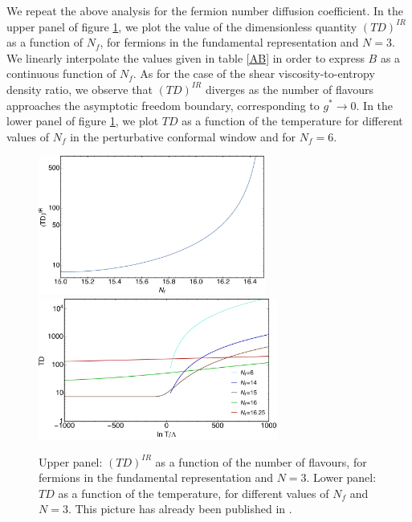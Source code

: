   
We repeat the above analysis for the fermion number diffusion coefficient. In the upper panel of figure \ref{D_Nf}, we plot the value of the dimensionless quantity $(T D)^{IR}$ as a function of $N_f$, for fermions in the fundamental representation and $N=3$. We linearly interpolate the values given in table \ref{AB} in order to express $B$ as a continuous function of $N_f$.
As for the case of the shear viscosity-to-entropy density ratio, we observe that $(TD)^{IR}$ diverges as the number of flavours approaches the asymptotic freedom boundary, corresponding to $g^* \to 0$. In the lower panel of figure \ref{D_Nf}, we plot $T D$ as a function of the temperature for different values of $N_f$ in the perturbative conformal window and for $N_f=6$. 

\begin{figure}[h!]
\begin{center}
\includegraphics[width=0.665\textwidth]{pics/TDaN3} \\
\includegraphics[width=0.7\textwidth]{pics/Temperature-TDaN3}
\end{center}
\caption{Upper panel: $(T D)^{IR}$ as a function of the number of flavours, for fermions in the fundamental representation and $N=3$. Lower panel: $T D$ as a function of the temperature, for different values of $N_f$ and $N=3$. This picture has already been published in \cite{Toniato:2016twr}.}
\label{D_Nf}
\end{figure}


